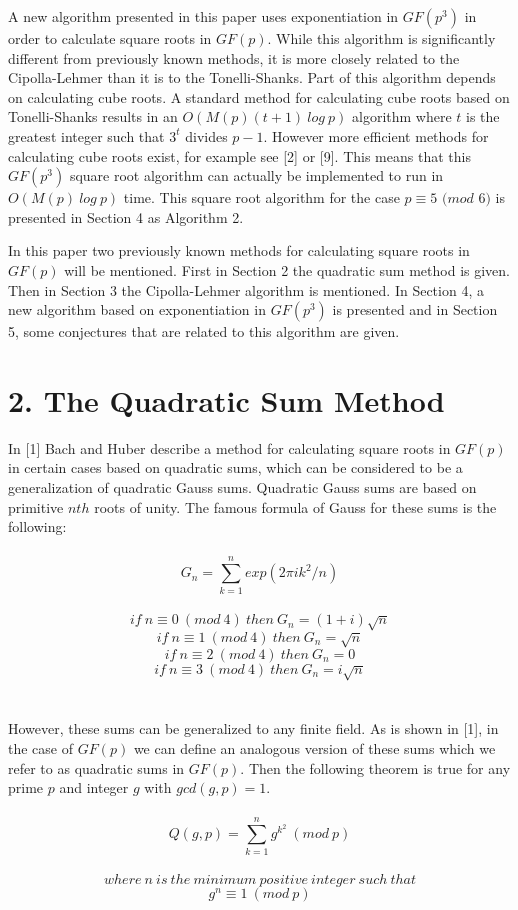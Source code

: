 \documentclass[final,letterpaper,oneside,10pt]{article}
\begin{document}
A new algorithm presented in this paper uses exponentiation in $GF(p^3)$ in order to calculate square roots in $GF(p)$.
While this algorithm is significantly different from previously known methods, it is more closely related to the Cipolla-Lehmer than
it is to the Tonelli-Shanks.  Part of this algorithm depends on calculating cube roots.  A standard method for calculating 
cube roots based on Tonelli-Shanks  results in an  $O(M(p)(t+1)~log~p)$ algorithm where $t$ is the greatest
integer such that $3^t$ divides $p-1$.  However more efficient methods for calculating cube roots exist, for example 
see [2] or [9].  This means that this $GF(p^3)$ square root algorithm can actually be implemented to run in $O(M(p)~log~p)$ time.
This square root algorithm for the case $p \equiv 5$ $(mod$ $6)$ is presented in Section 4 as Algorithm 2.

In this paper two previously known methods for calculating square roots in $GF(p)$ will be mentioned.  First in Section 2 the 
quadratic sum method is given.  Then in Section 3 the Cipolla-Lehmer algorithm is mentioned.  In Section 4, a new algorithm
based on exponentiation in $GF(p^3)$ is presented and  in Section 5, some conjectures that are related to this algorithm are given.
\\


\section*{2. The Quadratic Sum Method}
In [1] Bach and Huber describe a method for calculating square roots in $GF(p)$ in certain cases based on quadratic sums, which can be
considered to be a generalization of quadratic Gauss sums.  Quadratic Gauss sums are based on primitive $nth$ roots of unity.
The famous formula of Gauss for these sums is the following:
\\
\\
\[G_n = \sum_{k=1}^n exp(2 \pi ik^2/n)\]
\\
\[if~ n\equiv0~(mod~4)~then~G_n = (1+i)\sqrt{n}\]
\[if~ n\equiv1~(mod~4)~then~G_n = \sqrt{n}\]
\[if~ n\equiv2~(mod~4)~then~G_n = 0\]
\[if~ n\equiv3~(mod~4)~then~G_n = i\sqrt{n}\]
\\
\\
However, these sums can be generalized to any finite field.  As is shown in [1], in the case of $GF(p)$ we can define an analogous 
version of these sums which we refer to as quadratic sums in $GF(p)$.  Then the following theorem is true for any prime $p$
and integer $g$ with $gcd(g,p)=1$.
\\
\\
\[Q(g,p) = \sum_{k=1}^n g^{k^2}~(mod~ p)\]
\\
\[where~n~is~ the ~minimum ~positive~ integer~ such~ that\]
\[g^n\equiv1~(mod~p)\]
\end{document}
